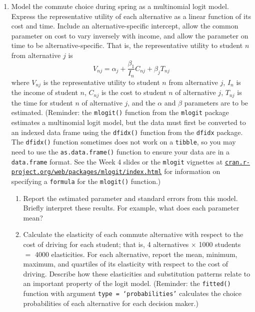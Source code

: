 \documentclass[11pt,letterpaper]{article}
\begin{document}
\begin{enumerate}[label=\alph*., leftmargin=*]
	\item Model the commute choice during spring as a multinomial logit model. Express the representative utility of each alternative as a linear function of its cost and time. Include an alternative-specific intercept, allow the common parameter on cost to vary inversely with income, and allow the parameter on time to be alternative-specific. That is, the representative utility to student $n$ from alternative $j$ is
	$$V_{nj} = \alpha_j + \frac{\beta_1}{I_n} C_{nj} + \beta_j T_{nj}$$
	where $V_{nj}$ is the representative utility to student $n$ from alternative $j$, $I_n$ is the income of student $n$, $C_{nj}$ is the cost to student $n$ of alternative $j$, $T_{nj}$ is the time for student $n$ of alternative $j$, and the $\alpha$ and $\beta$ parameters are to be estimated. (Reminder: the \texttt{mlogit()} function from the \texttt{mlogit} package estimates a multinomial logit model, but the data must first be converted to an indexed data frame using the \texttt{dfidx()} function from the \texttt{dfidx} package. The \texttt{dfidx()} function sometimes does not work on a \texttt{tibble}, so you may need to use the \texttt{as.data.frame()} function to ensure your data are in a \texttt{data.frame} format. See the Week 4 slides or the \texttt{mlogit} vignettes at \href{https://cran.r-project.org/web/packages/mlogit/index.html}{\texttt{cran.r-project.org/web/packages/mlogit/index.html}} for information on specifying a \texttt{formula} for the \texttt{mlogit()} function.)

	\begin{enumerate}[label=\roman*.]
		\item Report the estimated parameter and standard errors from this model. Briefly interpret these results. For example, what does each parameter mean?

		\item Calculate the elasticity of each commute alternative with respect to the cost of driving for each student; that is, 4 alternatives $\times$ 1000 students $=$ 4000 elasticities. For each alternative, report the mean, minimum, maximum, and quartiles of its elasticity with respect to the cost of driving. Describe how these elasticities and substitution patterns relate to an important property of the logit model. (Reminder: the \texttt{fitted()} function with argument \texttt{type = `probabilities'} calculates the choice probabilities of each alternative for each decision maker.)
	\end{enumerate}


\end{enumerate}
\end{document}
